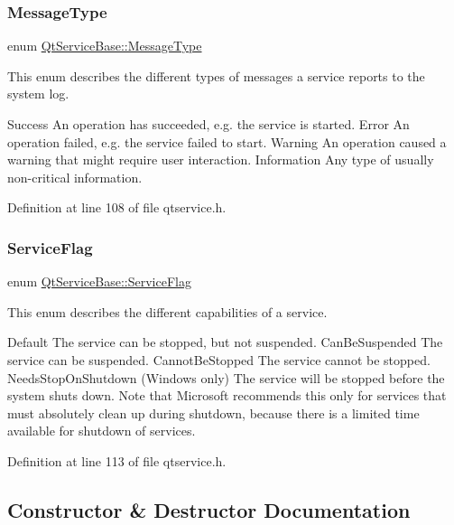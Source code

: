 \subsubsection{\texorpdfstring{Message\+Type}{MessageType}}
{\footnotesize\ttfamily enum \mbox{\hyperlink{class_qt_service_base_acffd9389fe7178bf1f35d8bf3dae1095}{Qt\+Service\+Base\+::\+Message\+Type}}}

This enum describes the different types of messages a service reports to the system log.

Success An operation has succeeded, e.\+g. the service is started.  Error An operation failed, e.\+g. the service failed to start.  Warning An operation caused a warning that might require user interaction.  Information Any type of usually non-\/critical information. 

Definition at line 108 of file qtservice.\+h.

\mbox{\label{class_qt_service_base_af6e74a87329ef64760783364538e5d51}} 
\subsubsection{\texorpdfstring{Service\+Flag}{ServiceFlag}}
{\footnotesize\ttfamily enum \mbox{\hyperlink{class_qt_service_base_af6e74a87329ef64760783364538e5d51}{Qt\+Service\+Base\+::\+Service\+Flag}}}

This enum describes the different capabilities of a service.

Default The service can be stopped, but not suspended.  Can\+Be\+Suspended The service can be suspended.  Cannot\+Be\+Stopped The service cannot be stopped.  Needs\+Stop\+On\+Shutdown (Windows only) The service will be stopped before the system shuts down. Note that Microsoft recommends this only for services that must absolutely clean up during shutdown, because there is a limited time available for shutdown of services. 

Definition at line 113 of file qtservice.\+h.



\subsection{Constructor \& Destructor Documentation}
\mbox{\label{class_qt_service_base_a75e3f82739df6dc0b9aa899b3f9552eb}} 
